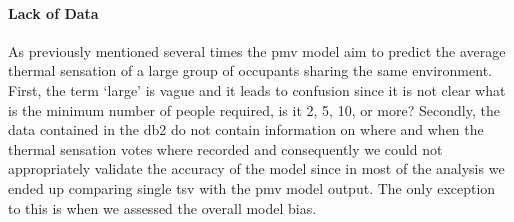 \paragraph{Lack of Data}
As previously mentioned several times the \ac{pmv} model aim to predict the average thermal sensation of a large group of occupants sharing the same environment.
First, the term `large' is vague and it leads to confusion since it is not clear what is the minimum number of people required, is it 2, 5, 10, or more?
Secondly, the data contained in the \gls{db2} do not contain information on where and when the thermal sensation votes where recorded and consequently we could not appropriately validate the accuracy of the model since in most of the analysis we ended up comparing single \ac{tsv} with the \ac{pmv} model output.
The only exception to this is when we assessed the overall model bias.

